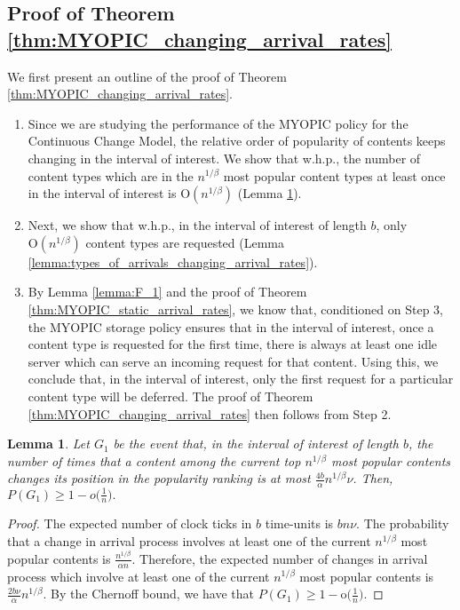 \documentclass[10pt, conference, letterpaper]{IEEEtran}
\newtheorem{lemma}{Lemma}
\def \OO {\mathrm{O}}
\def \oo {\mathrm{o}}
\begin{document}
\subsection{Proof of Theorem \ref{thm:MYOPIC_changing_arrival_rates}}
\label{sec:proof4}

\noindent We first present an outline of the proof of Theorem \ref{thm:MYOPIC_changing_arrival_rates}. 

\begin{enumerate}
	\item Since we are studying the performance of the MYOPIC policy for the Continuous Change Model, the relative order of popularity of contents keeps changing in the interval of interest. We show that w.h.p., the number of content types which are in the $n^{1/\beta}$ most popular content types at least once in the interval of interest is $\OO(n^{1/\beta})$ (Lemma \ref{lemma:change_in_heavy_hitters}).
	\item Next, we show that w.h.p., in the interval of interest of length $b$, only $\OO(n^{1/\beta})$ content types are requested (Lemma \ref{lemma:types_of_arrivals_changing_arrival_rates}).
	\item By Lemma \ref{lemma:F_1} and the proof of Theorem \ref{thm:MYOPIC_static_arrival_rates}, we know that, conditioned on Step 3, the MYOPIC storage policy ensures that in the interval of interest, once a content type is requested for the first time, there is always at least one idle server which can serve an incoming request for that content. Using this, we conclude that, in the interval of interest, only the first request for a particular content type will be deferred. The proof of Theorem \ref{thm:MYOPIC_changing_arrival_rates} then follows from Step 2.
\end{enumerate}


\begin{lemma}
	\label{lemma:change_in_heavy_hitters}
	Let $G_1$ be the event that, in the interval of interest of length $b$, the number of times that a content among the current top $n^{1/\beta}$ most popular contents changes its position in the popularity ranking is at most $\frac{4b}{\alpha} n^{1/\beta} \nu$. Then, $
	P(G_1) \geq 1-o\big( \frac{1}{n} \big).$
\end{lemma}
\begin{proof}
	The expected number of clock ticks in $b$ time-units is $bn\nu$. The probability that a change in arrival process involves at least one of the current $n^{1/\beta}$ most popular contents is $ \frac{n^{1/\beta}}{\alpha n}$. Therefore, the expected number of changes in arrival process which involve at least one of the current $n^{1/\beta}$ most popular contents is  $\frac{2b\nu}{\alpha} n^{1/\beta}$. By the Chernoff bound, we have that
	$
	P(G_1) \geq 1-\oo\big( \frac{1}{n} \big).
	$
\end{proof}
\end{document}
